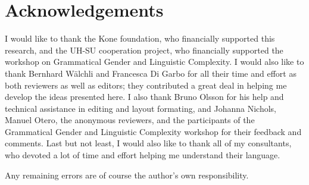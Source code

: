 \documentclass[output=collectionpaper,hidelinks]{langscibook}
\theoremstyle{remark}
\begin{document}
\section*{Acknowledgements}

I would like to thank the Kone foundation, who financially supported this research, and the UH-SU cooperation project, who financially supported the workshop on Grammatical Gender and Linguistic Complexity. I would also like to thank Bernhard Wälchli and Francesca Di Garbo for all their time and effort as both reviewers as well as editors; they contributed a great deal in helping me develop the ideas presented here. I also thank Bruno Olsson for his help and technical assistance in editing and layout formating, and Johanna Nichols, Manuel Otero, the anonymous reviewers, and the participants of the Grammatical Gender and Linguistic Complexity workshop for their feedback and comments. Last but not least, I would also like to thank all of my  consultants, who devoted a lot of time and effort helping me understand their language.

Any remaining errors are of course the author's own responsibility.


\printbibliography[heading=subbibliography]


\label{lastpage:Killian}
\end{document}
